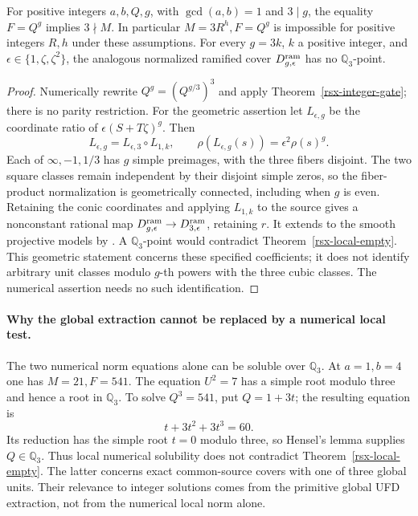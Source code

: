 \begin{corollary}
\label{rsx-propagation}
For positive integers \(a,b,Q,g\), with \(\gcd(a,b)=1\) and
\(3\mid g\), the equality \(F=Q^g\) implies \(3\nmid M\).
In particular \(M=3R^h,F=Q^g\) is impossible for positive
integers \(R,h\) under these assumptions.
For every \(g=3k\), \(k\) a positive integer, and
\(\epsilon\in\{1,\zeta,\zeta^2\}\), the analogous normalized
ramified cover \(D^{\rm ram}_{g,\epsilon}\) has no
\(\mathbb Q_3\)-point.
\end{corollary}
\begin{proof}
Numerically rewrite \(Q^g=(Q^{g/3})^3\) and apply
Theorem~\ref{rsx-integer-gate}; there is no parity restriction.
For the geometric assertion let \(L_{\epsilon,g}\) be the
coordinate ratio of \(\epsilon(S+T\zeta)^g\). Then
\[
 L_{\epsilon,g}=L_{\epsilon,3}\circ L_{1,k},
 \qquad \rho(L_{\epsilon,g}(s))=\epsilon^2\rho(s)^g .
\]
Each of \(\infty,-1,1/3\) has \(g\) simple preimages,
with the three fibers disjoint. The two square classes
remain independent by their disjoint simple zeros, so the
fiber-product normalization is geometrically connected,
including when \(g\) is even. Retaining the conic coordinates
and applying \(L_{1,k}\) to the source gives a nonconstant
rational map \(D^{\rm ram}_{g,\epsilon}\to
D^{\rm ram}_{3,\epsilon}\), retaining \(r\).
It extends to the smooth projective models by
\cite[Lemma~53.2.2 and Theorem~53.2.6]{StacksCurves2026}.
A \(\mathbb Q_3\)-point would contradict
Theorem~\ref{rsx-local-empty}.
This geometric statement concerns these specified
coefficients; it does not identify arbitrary unit classes
modulo \(g\)-th powers with the three cubic classes.
The numerical assertion needs no such identification.
\end{proof}

\paragraph{Why the global extraction cannot be replaced by a numerical
local test.}
The two numerical norm equations alone can be soluble over
\(\mathbb Q_3\). At \(a=1,b=4\) one has \(M=21,F=541\).
The equation \(U^2=7\) has a simple root modulo three and
hence a root in \(\mathbb Q_3\). To solve \(Q^3=541\), put
\(Q=1+3t\); the resulting equation is
\[
 t+3t^2+3t^3=60.
\]
Its reduction has the simple root \(t=0\) modulo three,
so Hensel's lemma supplies \(Q\in\mathbb Q_3\).
Thus local numerical solubility does not contradict
Theorem~\ref{rsx-local-empty}. The latter concerns exact
common-source covers with one of three global units.
Their relevance to integer solutions comes from the
primitive global UFD extraction, not from the numerical
local norm alone.

